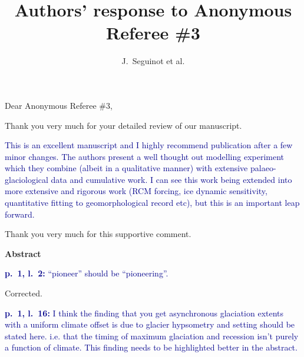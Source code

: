 

\title{Authors' response to Anonymous Referee \#3}
\author{J.~Seguinot et al.}


\maketitle
\bigskip


\newcommand{\sechead}[1]{\bigskip\noindent\textbf{#1}}
\newcommand{\referee}[1]{\bigskip\noindent\textcolor{darkblue}{#1}}
\newcommand{\msquote}[1]{\begin{quote}\textit{#1}\end{quote}}
\newcommand{\doi}[1]{doi:\allowbreak\href{http://dx.doi.org/#1}{#1}}

Dear Anonymous Referee \#3,

Thank you very much for your detailed review of our manuscript.

    \referee{%
        This is an excellent manuscript and I highly recommend publication
        after a few minor changes. The authors present a well thought out
        modelling experiment which they combine (albeit in a qualitative
        manner) with extensive palaeo-glaciological data and cumulative work. I
        can see this work being extended into more extensive and rigorous work
        (RCM forcing, ice dynamic sensitivity, quantitative fitting to
        geomorphological record etc), but this is an important leap forward.}

Thank you very much for this supportive comment.



\sechead{Abstract}

    \referee{\textbf{p.~1, l.~2:}
        ``pioneer'' should be ``pioneering''.}

        Corrected.

    \referee{\textbf{p.~1, l.~16:}
        I think the finding that you get asynchronous glaciation extents with a
        uniform climate offset is due to glacier hypsometry and setting should
        be stated here. i.e.  that the timing of maximum glaciation and
        recession isn't purely a function of climate. This finding needs to be
        highlighted better in the abstract.}

